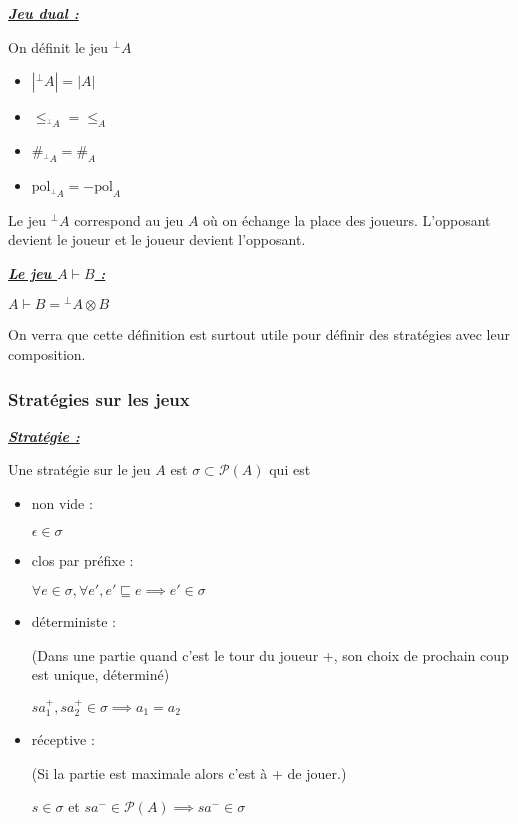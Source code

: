 \documentclass[a4paper,12ptCOUCOU
]{article}
\newlength{\mydepth}
\newlength{\myheight}
\newenvironment{answer}
{\par\begin{lrbox}{\mybox}\quad\begin{minipage}{\linewidth}\color{black}\setlength{\parskip}{10pt plus 1pt minus 1pt}\vspace*{-.7\baselineskip}}
{\end{minipage}\end{lrbox}
\settodepth{\mydepth}{\usebox{\mybox}}
\settoheight{\myheight}{\usebox{\mybox}}
\addtolength{\myheight}{\mydepth}
\noindent\makebox[0pt]{
  \color{gray}\hspace{-0pt}\rule[-\mydepth]{1pt}{\myheight}}
\usebox{\mybox}
  }
\begin{document}
\vspace{0.4cm}\begin{minipage}{\linewidth}\textbf{\textit{\underline{ Jeu dual : }}} \begin{answer}
On définit le jeu ${}^\bot A$
\begin{itemize}
\item $|{}^\bot A| = |A|$
\item $\leq_{{}^\bot A} = \leq_A$
\item $\#_{{}^\bot A} = \#_A$
\item $\text{pol}_{{}^\bot A} = - \text{pol}_A$
\end{itemize}
\end{answer}\end{minipage}

Le jeu ${}^\bot A$ correspond au jeu $A$ où on échange la place des joueurs.
L'opposant devient le joueur et le joueur devient l'opposant.

\vspace{0.4cm}\begin{minipage}{\linewidth}\textbf{\textit{\underline{ Le jeu $A \vdash B$ : }}} \begin{answer}
$A \vdash B = {}^\bot A \otimes B$
\end{answer}\end{minipage}

On verra que cette définition est surtout utile pour définir des stratégies
avec leur composition.

\subsubsection{Stratégies sur les jeux}

\vspace{0.4cm}\begin{minipage}{\linewidth}\textbf{\textit{\underline{ Stratégie : }}} \begin{answer}
Une stratégie sur le jeu $A$ est $\sigma \subset \mathcal{P}(A)$ qui est
\begin{itemize}
\item non vide :

$\epsilon \in \sigma$

\item clos par préfixe :

$\forall e \in \sigma, \forall e', e' \sqsubseteq e \implies e' \in \sigma$

\item déterministe :

(Dans une partie quand c'est le tour du joueur +, son choix de prochain coup
est unique, déterminé)

$sa_1^+, sa_2^+ \in \sigma \implies a_1 = a_2$

\item réceptive :

(Si la partie est maximale alors c'est à + de jouer.)

$s \in \sigma$ et $sa^- \in \mathcal{P}(A) \implies sa^- \in \sigma$
\end{itemize}
\end{answer}\end{minipage}
\end{document}
